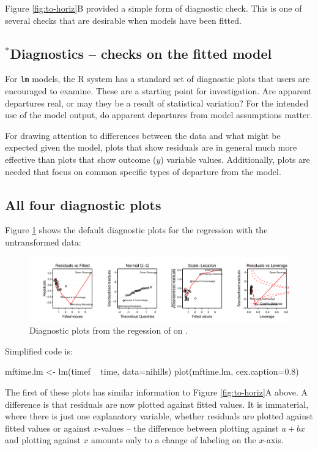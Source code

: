 Figure \ref{fig:to-horiz}B provided a simple form of diagnostic check.
This is one of several checks that are desirable when models
have been fitted.

\subsection{$^*$Diagnostics -- checks on the fitted model}\label{ss:diag}

For \texttt{lm} models, the R system has a standard set of diagnostic
plots that users are encouraged to examine.  These are a starting
point for investigation. Are apparent departures real, or may they be a
result of statistical variation?  For the intended use of the model
output, do apparent departures from model assumptions matter.

For drawing attention to differences between the data and what might
be expected given the model, plots that show residuals are in general
much more effective than plots that show outcome ($y$) variable
values. Additionally, plots are needed that focus on common specific
types of departure from the model.

\subsection*{All four diagnostic plots}
Figure \ref{fig:diag-mftime} shows the default
diagnostic plots for the regression with the untransformed data:

\begin{figure}
\begin{Schunk}


\centerline{\includegraphics[width=\textwidth]{figs/8-diag-mf-1} }

\end{Schunk}
\caption{Diagnostic plots from the regession of  on
  .}\label{fig:diag-mftime}
\end{figure}
\noindent
Simplified code is:
\begin{Schunk}
\begin{Sinput}
mftime.lm <- lm(timef ~ time, data=nihills)
plot(mftime.lm, cex.caption=0.8)
\end{Sinput}
\end{Schunk}
The first of these plots has similar information to Figure \ref{fig:to-horiz}A
above.  A difference is that residuals are now plotted against fitted
values.  It is immaterial, where there is just one explanatory variable,
whether residuals are plotted against fitted values or against
$x$-values -- the difference between plotting against $a + b x$ and
plotting against $x$ amounts only to a change of labeling on the
$x$-axis.

